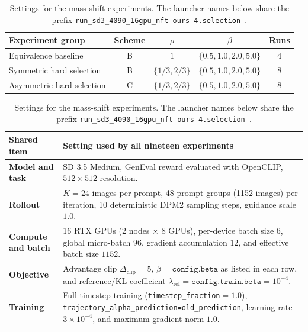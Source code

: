 \documentclass{article} %
\begin{document}
\begin{table}[H]
    \centering
    \caption{Settings for the mass-shift experiments.  The launcher
    names below share the prefix
    \texttt{run\_sd3\_4090\_16gpu\_nft-ours-4.selection-}.}
    \label{tab:mass-shift-hard-selection-sweep}
    \small
    \setlength{\tabcolsep}{4pt}
    \renewcommand{\arraystretch}{1.15}
    \begin{tabularx}{\textwidth}{@{}X c c c c@{}}
        \toprule
        Experiment group & Scheme & $\rho$ & $\beta$ & Runs \\
        \midrule
        Equivalence baseline & B & $1$ & $\{0.5,1.0,2.0,5.0\}$ & $4$ \\
        \midrule
        Symmetric hard selection & B
        & $\{1/3,2/3\}$ & $\{0.5,1.0,2.0,5.0\}$ & $8$ \\
        \midrule
        Asymmetric hard selection & C
        & $\{1/3,2/3\}$ & $\{0.5,1.0,2.0,5.0\}$ & $8$ \\
        \bottomrule
    \end{tabularx}


    \vspace{0.6em}
    \begin{tabularx}{\textwidth}{@{}>{\bfseries}l X@{}}
        \toprule
        Shared item & Setting used by all nineteen experiments \\
        \midrule
        Model and task
        & SD 3.5 Medium, GenEval reward evaluated with
          OpenCLIP, $512\times512$ resolution. \\
        Rollout
        & $K=24$ images per prompt, 48 prompt groups (1152 images) per
          iteration, 10 deterministic DPM2 sampling steps, guidance scale
          $1.0$. \\
        Compute and batch
        & 16 RTX GPUs ($2$ nodes $\times$ $8$ GPUs), per-device batch
          size $6$, global micro-batch $96$, gradient accumulation $12$, and
          effective batch size $1152$. \\
        Objective
        & Advantage clip $\Delta_{\mathrm{clip}}=5$,
          $\beta=\texttt{config.beta}$ as listed in each row,
          and reference/KL
          coefficient $\lambda_{\mathrm{ref}}=\texttt{config.train.beta}=10^{-4}$. \\
        Training
        & Full-timestep training
          (\texttt{timestep\_fraction}$=1.0$),
          \texttt{trajectory\_alpha\_prediction=old\_prediction}, learning rate $3\times10^{-4}$, and maximum gradient norm
          $1.0$. \\
        \bottomrule
    \end{tabularx}
\end{table}
\end{document}
